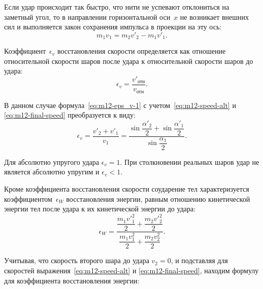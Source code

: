 \documentclass[a4paper, 12pt]{extarticle}
\newcommand{\eps}{\epsilon}
\begin{document}
Если удар происходит так быстро, что нити не успевают отклониться на заметный угол, то в направлении горизонтальной оси~$x$ не возникает внешних сил и выполняется закон сохранения импульса в проекции на эту ось: %
\begin{equation}
\label{eq:m12-momentum}
m_1 v_1 = m_2 v'_2 - m_1 v'_1.
\end{equation}

Коэффициент~$\eps_v$ восстановления скорости определяется как отношение относительной скорости шаров после удара к относительной скорости шаров до удара:
\begin{equation}
\label{eq:m12-eps_v-1}
\eps_v = \frac{v'_\text{отн}}{v_\text{отн}}.
\end{equation}

В данном случае формула~\eqref{eq:m12-eps_v-1} с учетом~\eqref{eq:m12-speed-alt} и \eqref{eq:m12-final-speed} преобразуется к виду: %
\begin{equation}
\label{eq:m12-eps_v-2}
\eps_v = \frac{v'_2 + v'_1}{v_1} = \frac{\sin \dfrac{\alpha'_2}{2} + \sin \dfrac{\alpha'_1}{2}}{\sin \dfrac{\alpha_1}{2}}.
\end{equation}

Для абсолютно упругого удара $\eps_v = 1$. При столкновении реальных шаров удар не является абсолютно упругим и $\eps_v < 1$. %

Кроме коэффициента восстановления скорости соударение тел характеризуется коэффициентом~$\eps_W$ восстановления энергии, равным отношению кинетической энергии тел после удара к их кинетической энергии до удара:
\begin{equation}
\label{eq:m12-eps_W-1}
\eps_W = \frac{\dfrac{m_1 v'^2_1}{2} + \dfrac{m_2 v'^2_2}{2}}{\dfrac{m_1 v^2_1}{2} + \dfrac{m_2 v^2_2}{2}}.
\end{equation} %

Учитывая, что скорость второго шара до удара $v_2 = 0$, и подставляя для скоростей выражения~\eqref{eq:m12-speed-alt} и \eqref{eq:m12-final-speed}, находим формулу для коэффициента восстановления энергии: %
\end{document}
